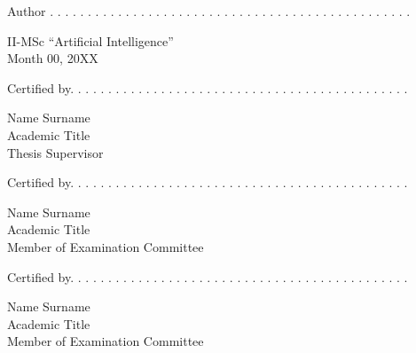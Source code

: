 \documentclass[12pt]{article}
\begin{document}
Author . . . . . . . . . . . . . . . . . . . . . . . . . . . . . . . . . . . . . . . . . . . . . . . .\\
\begin{flushright}
    II-MSc “Artificial Intelligence” \\ Month  00, 20XX \\[4\baselineskip]
\end{flushright}

Certified by. . . . . . . . . . . . . . . . . . . . . . . . . . . . . . . . . . . . . . . . . . . . .

\begin{flushright}
    Name Surname \\ 
    Academic Title \\
    Thesis Supervisor \\[6\baselineskip]
\end{flushright}

Certified by. . . . . . . . . . . . . . . . . . . . . . . . . . . . . . . . . . . . . . . . . . . . .

\begin{flushright}
    Name Surname \\ 
    Academic Title \\
    Member of  Examination Committee \\[6\baselineskip]
\end{flushright}

Certified by. . . . . . . . . . . . . . . . . . . . . . . . . . . . . . . . . . . . . . . . . . . . .
\begin{flushright}
    Name Surname \\ 
    Academic Title \\
    Member of  Examination Committee
\end{flushright}

\newpage



\newpage



\newpage

\tableofcontents



\newpage



\newpage



\newpage
\end{document}
